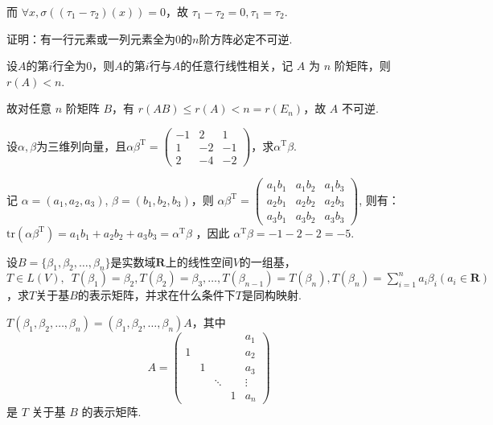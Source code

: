 \begin{exercise}
\begin{exgroup}
\begin{answer}
            而 $\forall x, \sigma((\tau_1-\tau_2)(x))=0$，故 $\tau_1-\tau_2=0, \tau_1=\tau_2$.
        \end{answer}

        \item 证明：有一行元素或一列元素全为0的$n$阶方阵必定不可逆.
        \begin{answer}
            设$A$的第$i$行全为0，则$A$的第$i$行与$A$的任意行线性相关，记 $A$ 为 $n$ 阶矩阵，则$r(A) < n$.

            故对任意 $n$ 阶矩阵 $B$，有 $r(AB) \leq r(A) < n = r(E_n)$，故 $A$ 不可逆.
        \end{answer}

        \item 设$\alpha,\beta$为三维列向量，且$\alpha\beta^\mathrm{T}=\begin{pmatrix}
                -1 & 2  & 1  \\
                1  & -2 & -1 \\
                2  & -4 & -2
            \end{pmatrix}$，求$\alpha^\mathrm{T}\beta$.
        \begin{answer}
            记 $\alpha = (a_1,a_2,a_3)$, $\beta = (b_1,b_2,b_3)$，则 $\alpha\beta^\mathrm{T} = \begin{pmatrix}
                    a_1b_1 & a_1b_2 & a_1b_3 \\
                    a_2b_1 & a_2b_2 & a_2b_3 \\
                    a_3b_1 & a_3b_2 & a_3b_3
                \end{pmatrix}$,
            则有：$\text{tr}(\alpha\beta^\mathrm{T}) = a_1b_1+a_2b_2+a_3b_3 = \alpha^\mathrm{T}\beta$ ，因此 $\alpha^\mathrm{T}\beta = -1-2-2 = -5$.
        \end{answer}
    \end{exgroup}

    \begin{exgroup}
        \item 设$B=\{\beta_1,\beta_2,\ldots,\beta_n\}$是实数域$\mathbf{R}$上的线性空间$V$的一组基，$T \in L(V),\enspace T(\beta_1)=\beta_2,T(\beta_2)=\beta_3,\ldots,T(\beta_{n-1})=T(\beta_n),T(\beta_n)=\displaystyle\sum_{i=1}^{n}a_i\beta_i(a_i \in \mathbf{R})$，求$T$关于基$B$的表示矩阵，并求在什么条件下$T$是同构映射.
        \begin{answer}
            $ T(\beta_1, \beta_2, \ldots, \beta_n) = (\beta_1, \beta_2, \ldots, \beta_n)A $，其中
            \[ A = \begin{pmatrix}
                      &   &        &   & a_1    \\
                    1 &   &        &   & a_2    \\
                      & 1 &        &   & a_3    \\
                      &   & \ddots &   & \vdots \\
                      &   &        & 1 & a_n
                \end{pmatrix} \]
            是 $ T $ 关于基 $ B $ 的表示矩阵.


\end{answer}
\end{exgroup}
\end{exercise}
